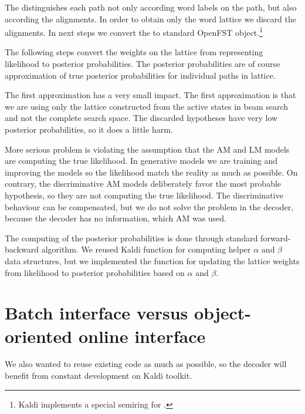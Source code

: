 The \/ distinguishes each path not only according word labels on the path,
but also according the alignments.
In order to obtain only the word lattice we discard the alignments.
In next steps we convert the \/ to standard OpenFST object.\footnote{Kaldi implements a special semiring for \cite{povey2012generating}.}  

The following steps convert the weights on the lattice from representing likelihood
to posterior probabilities. The posterior probabilities are of course approximation of
true posterior probabilities for individual paths in lattice. 

The first approximation has a very small impact. The first approximation is 
that we are using only the lattice constructed from the active states in beam search
and not the complete search space. 
The discarded hypotheses have very low posterior probabilities, so it does a little harm.

More serious problem is violating the assumption that the \ac{AM} and \ac{LM} models are 
computing the true likelihood. 
In generative models we are training and improving the models so the likelihood match
the reality as much as possible.
On contrary, the discriminative \ac{AM} models deliberately favor the most probable hypothesis,
so they are not computing the true likelihood.
The discriminative behaviour can be compensated, but we do not solve the problem
in the decoder, because the decoder has no information, which \ac{AM} was used.


The computing of the posterior probabilities is done through
standard forward-backward algorithm\cite{todo}.
We reused Kaldi function for computing helper $\alpha$ and $\beta$ data structures,
but we implemented the \/ function for updating the lattice weights 
from likelihood to posterior probabilities based on $\alpha$ and $\beta$.

\section{Batch interface versus object-oriented online interface}
\label{sec:ooi}

We also wanted to reuse existing code as much as possible,
so the decoder will benefit from constant development on Kaldi toolkit.

